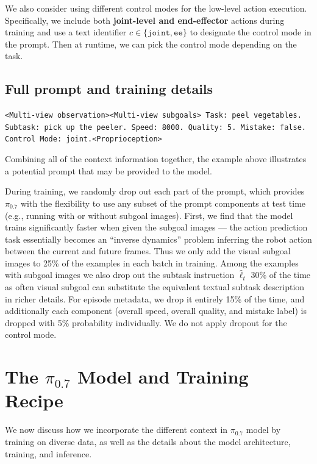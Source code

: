 \documentclass[conference]{IEEEtran}
\newcommand{\rawtext}{\hat{\ell}} %
\def \MethodName {$\pi_{0.7}$}
\def \ModelSymbol {$\pi_{0.7}$}
\begin{document}
We also consider using different control modes for the low-level action execution. Specifically, we include both \textbf{joint-level and end-effector} actions during training and use a text identifier $c \in \{\texttt{joint}, \texttt{ee}\}$ to designate the control mode in the prompt. Then at runtime, we can pick the control mode depending on the task. 

\subsection{Full prompt and training details}

\begin{tcolorbox}
\footnotesize
\texttt{<Multi-view observation><Multi-view subgoals> Task: peel vegetables. Subtask: pick up the peeler. Speed: 8000. Quality: 5. Mistake: false. Control Mode: joint.<Proprioception> }
\end{tcolorbox}
Combining all of the context information together, the example above illustrates a potential prompt that may be provided to the model.

During training, we randomly drop out each part of the prompt, which provides \MethodName{} with the flexibility to use any subset of the prompt components at test time (e.g., running with or without subgoal images).
First, we find that the model trains significantly faster when given the subgoal images --- the action prediction task essentially becomes an ``inverse dynamics'' problem inferring the robot action between the current and future frames. Thus we only add the visual subgoal images to 25\% of the examples in each batch in training. Among the examples with subgoal images we also drop out the subtask instruction $\rawtext_t$ 30\% of the time as often visual subgoal can substitute the equivalent textual subtask description in richer details. For episode metadata, we drop it entirely 15\% of the time, and additionally each component (overall speed, overall quality, and mistake label) is dropped with 5\% probability individually. We do not apply dropout for the control mode.

\section{The \texorpdfstring{\ModelSymbol{}}{pi0.7} Model and Training Recipe}
\label{sec:method}


We now discuss how we incorporate the different context in \ModelSymbol{} model by training on diverse data, as well as the details about the model architecture, training, and inference.
\end{document}
